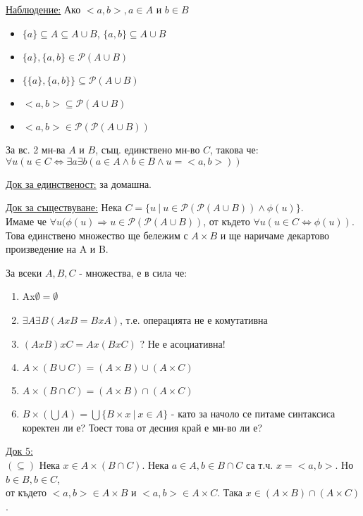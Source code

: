 \documentclass[fleqn, titlepage, 12pt]{report}
\begin{document}
\underline{Наблюдение:} Ако $ <a,b>, a \in A$ и $b \in B$
\begin{itemize}
  \item $ \{ a\} \subseteq  A \subseteq A \cup B$, $ \{ a,b\} \subseteq A \cup B$
  \item $ \{ a\}, \{ a, b\} \in \mathcal{P}(A \cup B) $
  \item $ \{ \{ a\}, \{ a,b\}\} \subseteq \mathcal{P}(A \cup B) $
  \item $ <a,b> \subseteq \mathcal{P}(A \cup B) $
  \item $ <a,b> \in \mathcal{P}( \mathcal{P} (A \cup B)) $
\end{itemize}

\bigbreak
{} За вс. 2 мн-ва $A$ и $B$, същ. единствено мн-во $C$, такова че:\\
$ \forall{u} (u \in C \Leftrightarrow \exists{a} \exists{b} (a \in A \land b \in B \land u = <a,b>))$
\bigbreak

\underline{Док за единственост:} за домашна.
\bigbreak

\underline{Док за съществуване:} Нека $C = \{u\ |\ u \in \mathcal{P}( \mathcal{P}(A \cup B) ) \land \phi(u)\} $.\\
Имаме че $ \forall{u} ( \phi(u) \Rightarrow u \in \mathcal{P}( \mathcal{P}(A \cup B) )$, от където
$ \forall{u} (u \in C \Leftrightarrow \phi(u) )$.
Това единствено множество ще бележим с $A \times B$ и ще наричаме декартово произведение на A и B.
\bigbreak

 За всеки $A, B, C$ - множества, е в сила че:
\begin{enumerate}
  \item Ax$\emptyset = \emptyset $
  \item $ \exists{A} \exists{B} (AxB = BxA)$, т.е. операцията не е комутативна
  \item $(AxB)xC = Ax(BxC)$ ? Не е асоциативна!
  \item $A \times (B \cup C) = (A \times B) \cup (A \times C)$
  \item $A \times (B \cap C) = (A \times B) \cap (A \times C)$
  \item $B \times (\bigcup A) = \bigcup \{ B \times x\ |\ x \in A\}$ - като за начоло се питаме синтаксиса коректен ли е?
    Тоест това от десния край е мн-во ли е?
\end{enumerate}
\bigbreak

\underline{Док 5:}\\
$(\subseteq)$ Нека $x \in A \times (B \cap C )$. Нека $a \in A, b \in B \cap C$ са т.ч.
$x = <a,b>$. Но $b \in B, b \in C$,\\ от където $<a,b> \in A \times B$ и $<a,b> \in A \times C$.
Така $x \in (A \times B) \cap (A \times C)$.
\bigbreak
\end{document}
